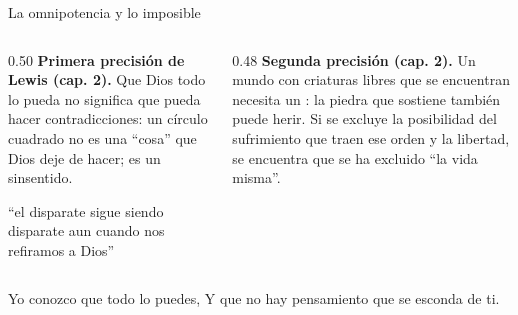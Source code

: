 \begin{frame}{La omnipotencia y lo imposible}
\begin{columns}[t,onlytextwidth]
\begin{column}{0.50\textwidth}\small
\textbf{Primera precisión de Lewis (cap. 2).} Que Dios todo lo pueda no significa que pueda hacer contradicciones: un círculo cuadrado no es una ``cosa'' que Dios deje de hacer; es un sinsentido.
\begin{tcolorbox}[colback=papiro,colframe=dorado,boxrule=1.2pt,arc=3pt]
\footnotesize ``el disparate sigue siendo disparate aun cuando nos refiramos a Dios''
\end{tcolorbox}
\end{column}
\begin{column}{0.48\textwidth}\small
\textbf{Segunda precisión (cap. 2).} Un mundo con criaturas libres que se encuentran necesita un : la piedra que sostiene también puede herir. Si se excluye la posibilidad del sufrimiento que traen ese orden y la libertad, se encuentra que se ha excluido ``la vida misma''.
\end{column}
\end{columns}\par\medskip
\begin{cita}Yo conozco que todo lo puedes, Y que no hay pensamiento que se esconda de ti.\end{cita}
\end{frame}

